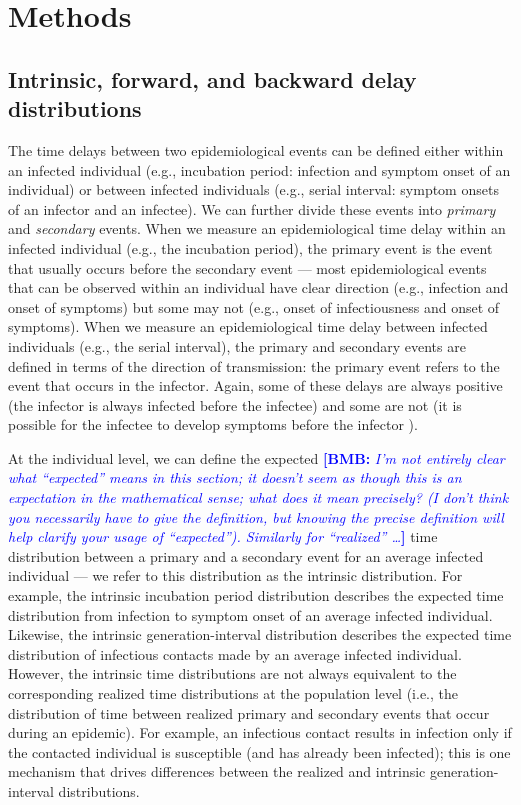 \documentclass[12pt]{article}
\newcommand{\comment}{\showcomment}
\newcommand{\showcomment}[3]{\textcolor{#1}{\textbf{[#2: }\textsl{#3}\textbf{]}}}
\newcommand{\bmb}[1]{\comment{blue}{BMB}{#1}}
\begin{document}
\section{Methods}

\subsection{Intrinsic, forward, and backward delay distributions}

The time delays between two epidemiological events can be defined either within an infected individual (e.g., incubation period: infection and symptom onset of an individual) or between infected individuals (e.g., serial interval: symptom onsets of an infector and an infectee).
We can further divide these events into \emph{primary} and \emph{secondary} events.
When we measure an epidemiological time delay within an infected individual (e.g., the incubation period), the primary event is the event that usually occurs before the secondary event ---
most epidemiological events that can be observed within an individual have clear direction (e.g., infection and onset of symptoms) but some may not (e.g., onset of infectiousness and onset of symptoms).
When we measure an epidemiological time delay between infected individuals (e.g., the serial interval), 
the primary and secondary events are defined in terms of the direction of transmission:
the primary event refers to the event that occurs in the infector. 
Again, some of these delays are always positive (the infector is always infected before the infectee) and some are not (it is possible for the infectee to develop symptoms before the infector \citep{he2020temporal}).

At the individual level, we can define the expected \bmb{I'm not entirely clear what ``expected'' means in this section; it doesn't seem as though this is an expectation in the mathematical sense; what does it mean precisely? (I don't think you necessarily have to give the definition, but knowing the precise definition  will help clarify your usage of ``expected''). Similarly for ``realized'' \ldots} time distribution between a primary and a secondary event for an average infected individual --- we refer to this distribution as the intrinsic distribution.
For example, the intrinsic incubation period distribution describes the expected time distribution from infection to symptom onset of an average infected individual.
Likewise, the intrinsic generation-interval distribution describes the expected time distribution of infectious contacts made by an average infected individual.
However, the intrinsic time distributions are not always equivalent to the corresponding realized time distributions at the population level (i.e., the distribution of time between realized primary and secondary events that occur during an epidemic).
For example, an infectious contact results in infection only if the contacted individual is susceptible (and has already been infected);
this is one mechanism that drives differences between the realized and intrinsic generation-interval distributions.
\end{document}
